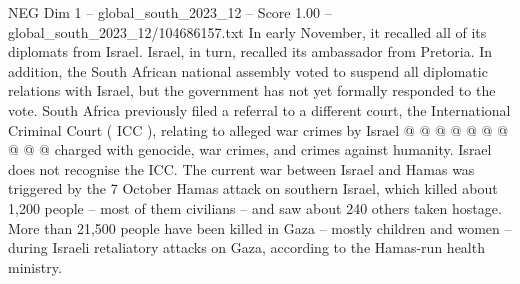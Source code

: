 \begin{textsample}{NEG Dim 1 – global\_south\_2023\_12 – Score 1.00 – global\_south\_2023\_12/104686157.txt}
In early November, it recalled all of its diplomats from Israel.
Israel, in turn, recalled its ambassador from Pretoria.
In addition, the South African national assembly voted to suspend all diplomatic relations with Israel, but the government has not yet formally responded to the vote.
South Africa previously filed a referral to a different court, the International Criminal Court ( ICC ), relating to alleged war crimes by Israel @ @ @ @ @ @ @ @ @ @ charged with genocide, war crimes, and crimes against humanity.
Israel does not recognise the ICC.
The current war between Israel and Hamas was triggered by the 7 October Hamas attack on southern Israel, which killed about 1,200 people -- most of them civilians -- and saw about 240 others taken hostage.
More than 21,500 people have been killed in Gaza -- mostly children and women -- during Israeli retaliatory attacks on Gaza, according to the Hamas-run health ministry.

\end{textsample}
